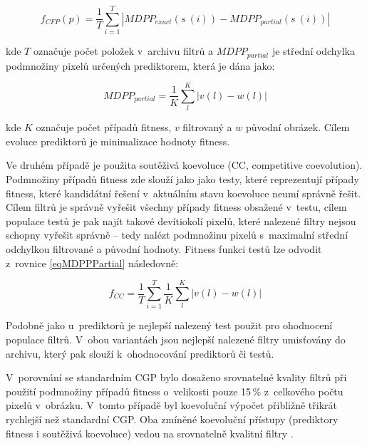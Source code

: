\begin{equation}
    \label{eqFpredictorIF}
    f_{\mathit{CFP}} \left( p \right) = \frac{1}{T} \sum\limits_{i=1}^{T} \left| \mathit{MDPP_{exact}} \left( s~\left( i \right) \right) - \mathit{MDPP_{partial}} \left( s~\left( i \right) \right) \right|
\end{equation}

\noindent{}kde $T$ označuje počet položek v~archivu filtrů a $\mathit{MDPP_{partial}}$ je střední odchylka podmnožiny pixelů určených prediktorem, která je dána jako:

\begin{equation}
    \label{eqMDPPPartial}
    \mathit{MDPP_{partial}} = \frac{1}{K} \sum\limits_l^K \left| v\left( l \right) - w\left( l \right) \right|
\end{equation}

\noindent{}kde $K$ označuje počet případů fitness, $v$ filtrovaný a $w$ původní obrázek. Cílem evoluce prediktorů je minimalizace hodnoty fitness.

Ve druhém případě je použita soutěživá koevoluce (CC, competitive coevolution). Podmnožiny případů fitness zde slouží jako jako testy, které reprezentují případy fitness, které kandidátní řešení v~aktuálním stavu koevoluce neumí správně řešit. Cílem filtrů je správně vyřešit všechny případy fitness obsažené v~testu, cílem populace testů je pak najít takové devítiokolí pixelů, které nalezené filtry nejsou schopny vyřešit správně -- tedy nalézt podmnožinu pixelů s~maximalní střední odchylkou filtrované a původní hodnoty. Fitness funkci testů lze odvodit z~rovnice \ref{eqMDPPPartial} následovně:

\begin{equation}
    \label{eqFtestsIF}
    f_{\mathit{CC}} = \frac{1}{T} \sum\limits_{i=1}^{T} \frac{1}{K} \sum\limits_l^K \left| v\left( l \right) - w\left( l \right) \right|
\end{equation}

Podobně jako u~prediktorů je nejlepší nalezený test použit pro ohodnocení populace filtrů. V~obou variantách jsou nejlepší nalezené filtry umisťovány do archivu, který pak slouží k~ohodnocování prediktorů či testů.

V~porovnání se standardním CGP bylo dosaženo srovnatelné kvality filtrů při použití podmnožiny případů fitness o~velikosti pouze 15\,\% z~celkového počtu pixelů v~obrázku. V~tomto případě byl koevoluční výpočet přibližně třikrát rychlejší než standardní CGP. Oba zmíněné koevoluční přístupy (prediktory fitness i soutěživá koevoluce) vedou na srovnatelně kvalitní filtry \cite{SikuPPSN}.

